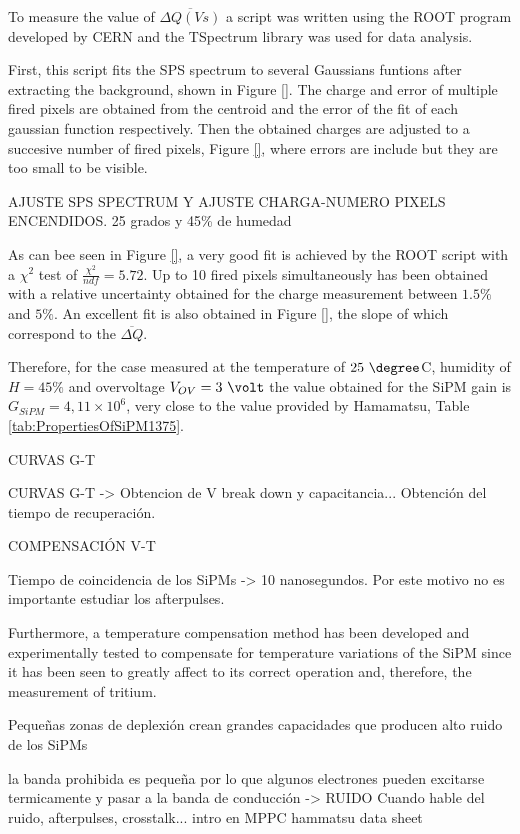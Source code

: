 To measure the value of $\overline{\Delta Q (Vs)}$ a script was written using the ROOT program \cite{ROOTWebPage} developed by CERN and the TSpectrum library was used for data analysis. 

First, this script fits the SPS spectrum to several Gaussians funtions after extracting the background, shown in Figure \ref{}. The charge and error of multiple fired pixels are obtained from the centroid and the error of the fit of each gaussian function respectively. Then the obtained charges are adjusted to a succesive number of fired pixels, Figure \ref{}, where errors are include but they are too small to be visible.

AJUSTE SPS SPECTRUM Y AJUSTE CHARGA-NUMERO PIXELS ENCENDIDOS. 25 grados y 45\% de humedad

As can bee seen in Figure \ref{}, a very good fit is achieved by the ROOT script with a $\chi^2$ test of $\frac{\chi^2}{ndf}=5.72$. Up to 10 fired pixels simultaneously has been obtained with a relative uncertainty obtained for the charge measurement between $1.5\%$ and $5\%$. An excellent fit is also obtained in Figure \ref{}, the slope of which correspond to the $\overline{\Delta Q}$.

Therefore, for the case measured at the temperature of $25~\degree$C, humidity of $H=45\%$ and overvoltage $V_{OV}=3~\volt$ the value obtained for the SiPM gain is $G_{SiPM}=4,11\times 10^{6}$, very close to the value provided by Hamamatsu, Table \ref{tab:PropertiesOfSiPM1375}.

CURVAS G-T 

CURVAS G-T -> Obtencion de V break down y capacitancia... Obtención del tiempo de recuperación.

COMPENSACIÓN V-T






Tiempo de coincidencia de los SiPMs -> 10 nanosegundos. Por este motivo no es importante estudiar los afterpulses.


Furthermore, a temperature compensation method has been developed and experimentally tested to compensate for temperature variations of the SiPM since it has been seen to greatly affect to its correct operation and, therefore, the measurement of tritium.


Pequeñas zonas de deplexión crean grandes capacidades que producen alto ruido de los SiPMs

la banda prohibida es pequeña por lo que algunos electrones pueden excitarse termicamente y pasar a la banda de conducción -> RUIDO
Cuando hable del ruido, afterpulses, crosstalk... intro en MPPC hammatsu data sheet

